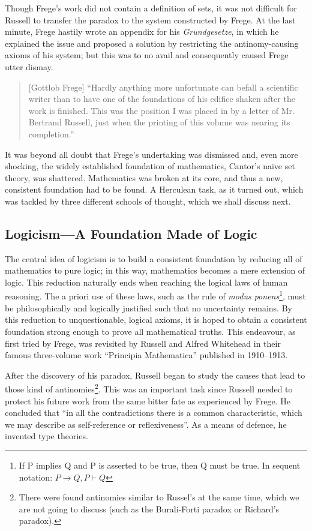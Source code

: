 \documentclass{article}
\begin{document}
Though Frege's work did not contain a definition of sets, it was not difficult for Russell to transfer the paradox to the system constructed by Frege. At the last minute, Frege hastily wrote an appendix for his \textit{Grundgesetze}, in which he explained the issue and proposed a solution by restricting the antinomy-causing axioms of his system; but this was to no avail and consequently caused Frege utter dismay.
\begin{quote}[Gottlob Frege]
``Hardly anything more unfortunate can befall a scientific writer than to have one of the foundations of his edifice shaken after the work is finished. This was the position I was placed in by a letter of Mr. Bertrand Russell, just when the printing of this volume was nearing its completion.''\cite{frege_appendix}
\end{quote}
It was beyond all doubt that Frege's undertaking was dismissed and, even more shocking, the widely established foundation of mathematics, Cantor's naive set theory, was shattered. Mathematics was broken at its core, and thus a new, consistent foundation had to be found. A Herculean task, as it turned out, which was tackled by three different schools of thought, which we shall discuss next.

\subsection{Logicism---A Foundation Made of Logic}\label{ssec_logicism}
The central idea of logicism is to build a consistent foundation by reducing all of mathematics to pure logic; in this way, mathematics becomes a mere extension of logic. This reduction naturally ends when reaching the logical laws of human reasoning. The a priori use of these laws, such as the rule of \textit{modus ponens}\footnote{If P implies Q and P is asserted to be true, then Q must be true. In sequent notation: $P\rightarrow Q, P\vdash Q$}, must be philosophically and logically justified such that no uncertainty remains. By this reduction to unquestionable, logical axioms, it is hoped to obtain a consistent foundation strong enough to prove all mathematical truths. This endeavour, as first tried by Frege, was revisited by Russell and Alfred Whitehead in their famous three-volume work ``Principia Mathematica'' published in 1910--1913.

After the discovery of his paradox, Russell began to study the causes that lead to those kind of antinomies\footnote{There were found antinomies similar to Russel's at the same time, which we are not going to discuss (such as the Burali-Forti paradox or Richard's paradox).\cite[pp.~5--10]{fraenkel}}. This was an important task since Russell needed to protect his future work from the same bitter fate as experienced by Frege. He concluded that ``in all the contradictions there is a common characteristic, which we may describe as self-reference or reflexiveness''\cite[p. 224]{russell_self_referentiality}. As a means of defence, he invented type theories. 
\end{document}

